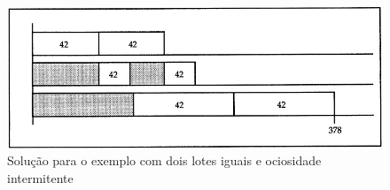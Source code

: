 \begin{figure}[!ht]
    \centering
    \includegraphics[scale=0.4]{Referencial/Figuras/Ls_ex2}
    \caption{Solução para o exemplo com dois lotes iguais e ociosidade intermitente}
    \label{fig:LS_ex2}
\end{figure}